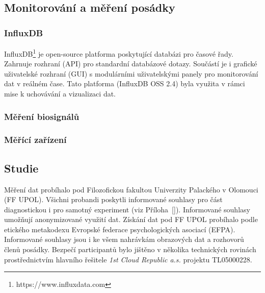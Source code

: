 \subsection{Monitorování a měření posádky}
\label{subsec:monitorovani posadky}


\subsubsection{InfluxDB}
\label{subsec:influx}
InfluxDB\footnote{https://www.influxdata.com} je open-source platforma
poskytující databázi pro časové řady. Zahrnuje rozhraní (API) pro standardní
databázové dotazy. Součástí je i grafické uživatelské rozhraní (GUI) s
modulárními uživatelskými panely pro monitorování dat v reálném čase. Tato
platforma (InfluxDB OSS 2.4) byla využita v rámci mise k uchovávání a
vizualizaci dat.

\subsubsection{Měření biosignálů}
\label{subsubsec:mereni_biosignalu}

\subsubsection{Měřící zařízení}
\label{subsubsec:merici_zarizeni}

\subsection{Studie}
\label{subsec:studie}
Měření dat probíhalo pod Filozofickou fakultou Univerzity Palackého v Olomouci
(\gls{FF UPOL}). Všichni probandi poskytli informované souhlasy pro část
diagnostickou i pro samotný experiment (viz Příloha~\ref{}). Informované
souhlasy umožňují anonymizované využití dat. Získání dat pod FF UPOL probíhalo
podle etického metakodexu Evropské federace psychologických asociací
(\gls{EFPA}). Informované souhlasy jsou i ke všem nahrávkám obrazových dat a
rozhovorů členů posádky. Bezpečí participantů bylo jištěno v několika
technických rovinách prostřednictvím hlavního řešitele \textit{1st Cloud
Republic a.s.} projektu TL05000228.